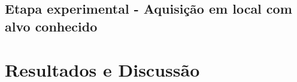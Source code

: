 \documentclass[a4paper, 12 pt]{article} %
\begin{document}

\subsection{Etapa experimental - Aquisição em local com alvo conhecido}

\blindtext 
%
\blindtext 
%
\blindtext

\clearpage


\section{Resultados e Discussão}
\label{ResultadosDiscussao}
\end{document}
